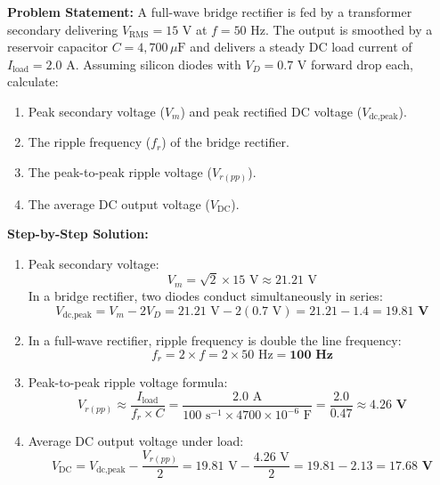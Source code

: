 \begin{tcolorbox}[colback=white,colframe=navyblue,title=\textbf{Problem 5: Full-Wave Bridge Rectifier and Filter Ripple Voltage}]
\textbf{Problem Statement:} A full-wave bridge rectifier is fed by a transformer secondary delivering $V_{\text{RMS}} = 15\text{ V}$ at $f = 50\text{ Hz}$. The output is smoothed by a reservoir capacitor $C = 4,700\,\mu\text{F}$ and delivers a steady DC load current of $I_{\text{load}} = 2.0\text{ A}$. Assuming silicon diodes with $V_D = 0.7\text{ V}$ forward drop each, calculate:
\begin{enumerate}[label=(\alph*),leftmargin=*]
    \item Peak secondary voltage ($V_m$) and peak rectified DC voltage ($V_{\text{dc,peak}}$).
    \item The ripple frequency ($f_r$) of the bridge rectifier.
    \item The peak-to-peak ripple voltage ($V_{r(pp)}$).
    \item The average DC output voltage ($V_{\text{DC}}$).
\end{enumerate}
\textbf{Step-by-Step Solution:}
\begin{enumerate}[label=(\alph*),leftmargin=*]
    \item Peak secondary voltage:
    \[
    V_m = \sqrt{2} \times 15\text{ V} \approx 21.21\text{ V}
    \]
    In a bridge rectifier, two diodes conduct simultaneously in series:
    \[
    V_{\text{dc,peak}} = V_m - 2 V_D = 21.21\text{ V} - 2(0.7\text{ V}) = 21.21 - 1.4 = \mathbf{19.81\text{ V}}
    \]
    \item In a full-wave rectifier, ripple frequency is double the line frequency:
    \[
    f_r = 2 \times f = 2 \times 50\text{ Hz} = \mathbf{100\text{ Hz}}
    \]
    \item Peak-to-peak ripple voltage formula:
    \[
    V_{r(pp)} \approx \frac{I_{\text{load}}}{f_r \times C} = \frac{2.0\text{ A}}{100\text{ s}^{-1} \times 4700 \times 10^{-6}\text{ F}} = \frac{2.0}{0.47} \approx \mathbf{4.26\text{ V}}
    \]
    \item Average DC output voltage under load:
    \[
    V_{\text{DC}} = V_{\text{dc,peak}} - \frac{V_{r(pp)}}{2} = 19.81\text{ V} - \frac{4.26\text{ V}}{2} = 19.81 - 2.13 = \mathbf{17.68\text{ V}}
    \]
\end{enumerate}
\end{tcolorbox}

